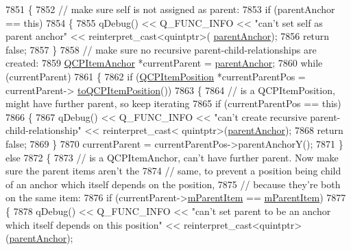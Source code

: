 \begin{DoxyCode}
7851 \{
7852   \textcolor{comment}{// make sure self is not assigned as parent:}
7853   \textcolor{keywordflow}{if} (parentAnchor == \textcolor{keyword}{this})
7854   \{
7855     qDebug() << Q\_FUNC\_INFO << \textcolor{stringliteral}{"can't set self as parent anchor"} << \textcolor{keyword}{reinterpret\_cast<}quintptr\textcolor{keyword}{>}(
      \hyperlink{class_q_c_p_item_position_a7b4ffab9946945c0e11cd2352dc2e042}{parentAnchor});
7856     \textcolor{keywordflow}{return} \textcolor{keyword}{false};
7857   \}
7858   \textcolor{comment}{// make sure no recursive parent-child-relationships are created:}
7859   \hyperlink{class_q_c_p_item_anchor}{QCPItemAnchor} *currentParent = \hyperlink{class_q_c_p_item_position_a7b4ffab9946945c0e11cd2352dc2e042}{parentAnchor};
7860   \textcolor{keywordflow}{while} (currentParent)
7861   \{
7862     \textcolor{keywordflow}{if} (\hyperlink{class_q_c_p_item_position}{QCPItemPosition} *currentParentPos = currentParent->
      \hyperlink{class_q_c_p_item_anchor_ac54b20120669950255a63587193dbb86}{toQCPItemPosition}())
7863     \{
7864       \textcolor{comment}{// is a QCPItemPosition, might have further parent, so keep iterating}
7865       \textcolor{keywordflow}{if} (currentParentPos == \textcolor{keyword}{this})
7866       \{
7867         qDebug() << Q\_FUNC\_INFO << \textcolor{stringliteral}{"can't create recursive parent-child-relationship"} << \textcolor{keyword}{reinterpret\_cast<}
      quintptr\textcolor{keyword}{>}(\hyperlink{class_q_c_p_item_position_a7b4ffab9946945c0e11cd2352dc2e042}{parentAnchor});
7868         \textcolor{keywordflow}{return} \textcolor{keyword}{false};
7869       \}
7870       currentParent = currentParentPos->parentAnchorY();
7871     \} \textcolor{keywordflow}{else}
7872     \{
7873       \textcolor{comment}{// is a QCPItemAnchor, can't have further parent. Now make sure the parent items aren't the}
7874       \textcolor{comment}{// same, to prevent a position being child of an anchor which itself depends on the position,}
7875       \textcolor{comment}{// because they're both on the same item:}
7876       \textcolor{keywordflow}{if} (currentParent->\hyperlink{class_q_c_p_item_anchor_a80fad480ad3bb980446ed6ebc00818ae}{mParentItem} == \hyperlink{class_q_c_p_item_anchor_a80fad480ad3bb980446ed6ebc00818ae}{mParentItem})
7877       \{
7878         qDebug() << Q\_FUNC\_INFO << \textcolor{stringliteral}{"can't set parent to be an anchor which itself depends on this position"}
       << \textcolor{keyword}{reinterpret\_cast<}quintptr\textcolor{keyword}{>}(\hyperlink{class_q_c_p_item_position_a7b4ffab9946945c0e11cd2352dc2e042}{parentAnchor});

\end{DoxyCode}
